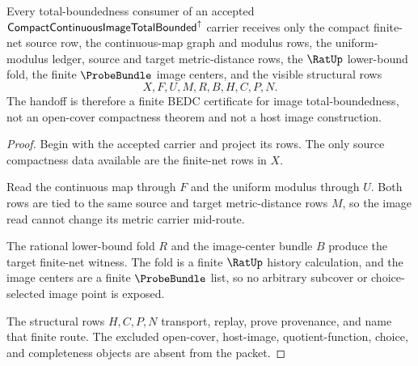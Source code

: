 \begin{theorem}
\label{thm:compact-continuous-image-total-bounded-handoff}
Every total-boundedness consumer of an accepted $\mathsf{CompactContinuousImageTotalBounded}^{\uparrow}$ carrier receives only the compact finite-net source row, the continuous-map graph and modulus rows, the uniform-modulus ledger, source and target metric-distance rows, the $\RatUp$ lower-bound fold, the finite $\ProbeBundle$ image centers, and the visible structural rows
$$
X,F,U,M,R,B,H,C,P,N .
$$
The handoff is therefore a finite BEDC certificate for image total-boundedness, not an open-cover compactness theorem and not a host image construction.
\end{theorem}
\begin{proof}
Begin with the accepted carrier and project its rows. The only source compactness data available are the finite-net rows in $X$.

Read the continuous map through $F$ and the uniform modulus through $U$. Both rows are tied to the same source and target metric-distance rows $M$, so the image read cannot change its metric carrier mid-route.

The rational lower-bound fold $R$ and the image-center bundle $B$ produce the target finite-net witness. The fold is a finite $\RatUp$ history calculation, and the image centers are a finite $\ProbeBundle$ list, so no arbitrary subcover or choice-selected image point is exposed.

The structural rows $H,C,P,N$ transport, replay, prove provenance, and name that finite route. The excluded open-cover, host-image, quotient-function, choice, and completeness objects are absent from the packet.
\end{proof}

